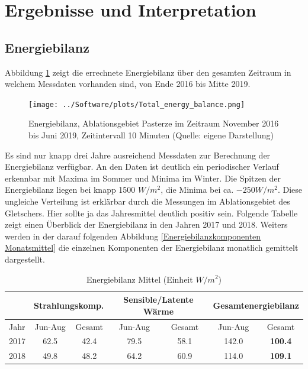 \documentclass[11pt,a4paper]{article}
\begin{document}
\pagebreak
\section{Ergebnisse und Interpretation}
\subsection{Energiebilanz}
Abbildung \ref{fig:Energiebilanz gesamter Messzeitraum, Zeitintervall 10 Minuten} zeigt die errechnete Energiebilanz über den gesamten Zeitraum in welchem Messdaten vorhanden sind, von Ende 2016 bis Mitte 2019. 

\begin{figure}[H]
\centering
\texttt{[image: ../Software/plots/Total\_energy\_balance.png]}
\caption[Energiebilanz, Ablationsgebiet Pasterze im Zeitraum November 2016 bis Juni 2019, Zeitintervall 10 Minuten]{Energiebilanz, Ablationsgebiet Pasterze im Zeitraum November 2016 bis Juni 2019, Zeitintervall 10 Minuten (Quelle: eigene Darstellung)}
\label{fig:Energiebilanz gesamter Messzeitraum, Zeitintervall 10 Minuten}
\end{figure}

Es sind nur knapp drei Jahre ausreichend Messdaten zur Berechnung der Energiebilanz verfügbar. An den Daten ist deutlich ein periodischer Verlauf erkennbar mit Maxima im Sommer und Minima im Winter. Die Spitzen der Energiebilanz liegen bei knapp 1500 $W/m^2$, die Minima bei ca. $-250 W/m^2$. Diese ungleiche Verteilung ist erklärbar durch die Messungen im Ablationsgebiet des Gletschers. Hier sollte ja das Jahresmittel deutlich positiv sein. Folgende Tabelle zeigt einen Überblick der Energiebilanz in den Jahren 2017 und 2018. Weiters werden in der darauf folgenden Abbildung \ref{Energiebilanzkomponenten Monatsmittel} die einzelnen Komponenten der Energiebilanz monatlich gemittelt dargestellt.

\begin{table}[H]
\centering
{} 
\caption{Energiebilanz Mittel (Einheit $W/m^2$)}
\label{tab:Energiebilanz Mittel}
\begin{tabular}{|l|cc|cc|cc|}
\hline
     & \multicolumn{2}{c|}{\textbf{Strahlungskomp}.} & \multicolumn{2}{c|}{\textbf{Sensible/Latente Wärme}} & \multicolumn{2}{c|}{\textbf{Gesamtenergiebilanz}} \\ \hline
Jahr & Jun-Aug           & Gesamt           & Jun-Aug               & Gesamt              & Jun-Aug         & Gesamt                 \\ \hline
2017 & 62.5              & 42.4             & 79.5                  & 58.1                & 142.0           & \textbf{100.4}         \\ \hline
2018 & 49.8              & 48.2             & 64.2                  & 60.9                & 114.0           & \textbf{109.1}         \\ \hline
\end{tabular}
\end{table}
\end{document}
